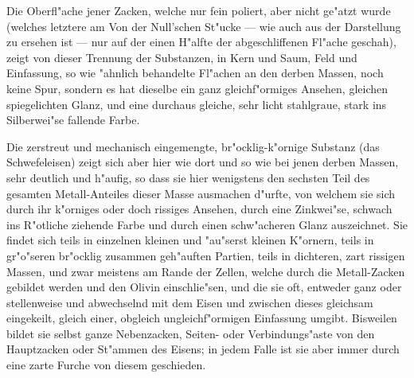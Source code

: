 \documentclass[a4paper, 11pt, oneside, german]{article}
\begin{document}
Die Oberfl"ache jener Zacken, welche nur fein poliert, aber nicht ge"atzt wurde (welches letztere am Von der Null'schen St"ucke --- wie auch aus der Darstellung zu ersehen ist --- nur auf der einen H"alfte der abgeschliffenen Fl"ache geschah), zeigt von dieser Trennung der Substanzen, in Kern und Saum, Feld und Einfassung, so wie "ahnlich behandelte Fl"achen an den derben Massen, noch keine Spur, sondern es hat dieselbe ein ganz gleichf"ormiges Ansehen, gleichen spiegelichten Glanz, und eine durchaus gleiche, sehr licht stahlgraue, stark ins Silberwei"se fallende Farbe.

Die zerstreut und mechanisch eingemengte, br"ocklig-k"ornige Substanz (das Schwefeleisen) zeigt sich aber hier wie dort und so wie bei jenen derben Massen, sehr deutlich und h"aufig, so dass sie hier wenigstens den sechsten Teil des gesamten Metall-Anteiles dieser Masse ausmachen d"urfte, von welchem sie sich durch ihr k"orniges oder doch rissiges Ansehen, durch eine Zinkwei"se, schwach ins R"otliche ziehende Farbe und durch einen schw"acheren Glanz auszeichnet. Sie findet sich teils in einzelnen kleinen und "au"serst kleinen K"ornern, teils in gr"o"seren br"ocklig zusammen geh"auften Partien, teils in dichteren, zart rissigen Massen, und zwar meistens am Rande der Zellen, welche durch die Metall-Zacken gebildet werden und den Olivin einschlie"sen, und die sie oft, entweder ganz oder stellenweise und abwechselnd mit dem Eisen und zwischen dieses gleichsam eingekeilt, gleich einer, obgleich ungleichf"ormigen Einfassung umgibt. Bisweilen bildet sie selbst ganze Nebenzacken, Seiten- oder Verbindungs"aste von den Hauptzacken oder St"ammen des Eisens; in jedem Falle ist sie aber immer durch eine zarte Furche von diesem geschieden.
\clearpage
\section{}
\subsection[\swabfamily{Plan der Gegend um Stannern in M"ahren.}]{}
\end{document}
